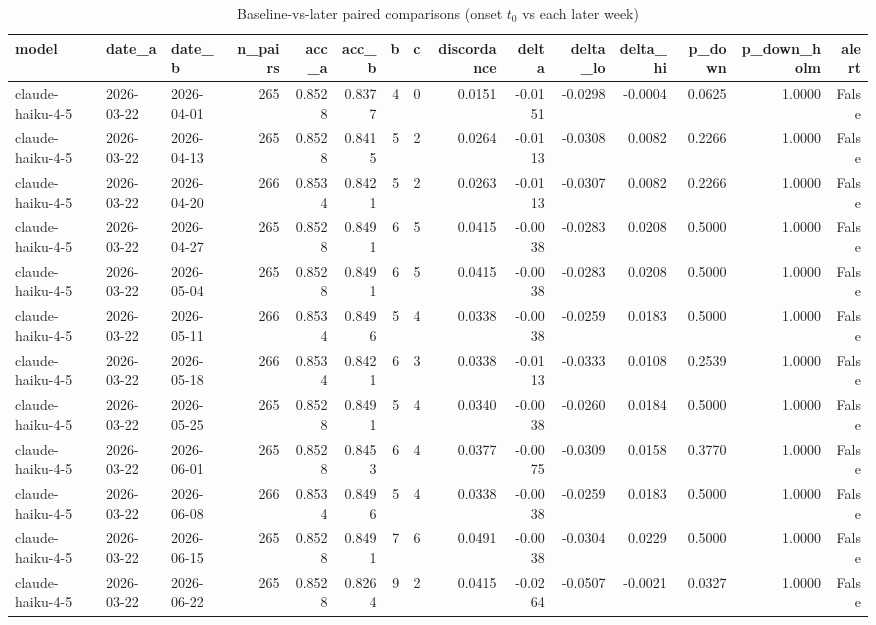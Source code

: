 \begin{table}
\caption{Baseline-vs-later paired comparisons (onset $t_0$ vs each later week)}
\label{tab:table-weekly-transitions}
\begin{tabular}{lllrrrrrrrrrrrr}
\toprule
model & date\_a & date\_b & n\_pairs & acc\_a & acc\_b & b & c & discordance & delta & delta\_lo & delta\_hi & p\_down & p\_down\_holm & alert \\
\midrule
claude-haiku-4-5 & 2026-03-22 & 2026-04-01 & 265 & 0.8528 & 0.8377 & 4 & 0 & 0.0151 & -0.0151 & -0.0298 & -0.0004 & 0.0625 & 1.0000 & False \\
claude-haiku-4-5 & 2026-03-22 & 2026-04-13 & 265 & 0.8528 & 0.8415 & 5 & 2 & 0.0264 & -0.0113 & -0.0308 & 0.0082 & 0.2266 & 1.0000 & False \\
claude-haiku-4-5 & 2026-03-22 & 2026-04-20 & 266 & 0.8534 & 0.8421 & 5 & 2 & 0.0263 & -0.0113 & -0.0307 & 0.0082 & 0.2266 & 1.0000 & False \\
claude-haiku-4-5 & 2026-03-22 & 2026-04-27 & 265 & 0.8528 & 0.8491 & 6 & 5 & 0.0415 & -0.0038 & -0.0283 & 0.0208 & 0.5000 & 1.0000 & False \\
claude-haiku-4-5 & 2026-03-22 & 2026-05-04 & 265 & 0.8528 & 0.8491 & 6 & 5 & 0.0415 & -0.0038 & -0.0283 & 0.0208 & 0.5000 & 1.0000 & False \\
claude-haiku-4-5 & 2026-03-22 & 2026-05-11 & 266 & 0.8534 & 0.8496 & 5 & 4 & 0.0338 & -0.0038 & -0.0259 & 0.0183 & 0.5000 & 1.0000 & False \\
claude-haiku-4-5 & 2026-03-22 & 2026-05-18 & 266 & 0.8534 & 0.8421 & 6 & 3 & 0.0338 & -0.0113 & -0.0333 & 0.0108 & 0.2539 & 1.0000 & False \\
claude-haiku-4-5 & 2026-03-22 & 2026-05-25 & 265 & 0.8528 & 0.8491 & 5 & 4 & 0.0340 & -0.0038 & -0.0260 & 0.0184 & 0.5000 & 1.0000 & False \\
claude-haiku-4-5 & 2026-03-22 & 2026-06-01 & 265 & 0.8528 & 0.8453 & 6 & 4 & 0.0377 & -0.0075 & -0.0309 & 0.0158 & 0.3770 & 1.0000 & False \\
claude-haiku-4-5 & 2026-03-22 & 2026-06-08 & 266 & 0.8534 & 0.8496 & 5 & 4 & 0.0338 & -0.0038 & -0.0259 & 0.0183 & 0.5000 & 1.0000 & False \\
claude-haiku-4-5 & 2026-03-22 & 2026-06-15 & 265 & 0.8528 & 0.8491 & 7 & 6 & 0.0491 & -0.0038 & -0.0304 & 0.0229 & 0.5000 & 1.0000 & False \\
claude-haiku-4-5 & 2026-03-22 & 2026-06-22 & 265 & 0.8528 & 0.8264 & 9 & 2 & 0.0415 & -0.0264 & -0.0507 & -0.0021 & 0.0327 & 1.0000 & False \\

\end{tabular}
\end{table}
